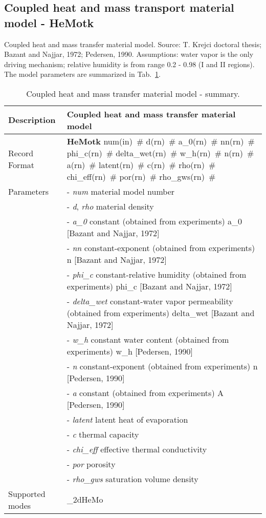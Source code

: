 \documentclass[a4paper]{article}
\newcommand{\descitem}[1]{{\noindent \bf #1}}
\newcommand{\elemparam}[2]{{{#1\tiny (#2)}~\#}}
\newcommand{\param}[1]{{\it #1}}
\newenvironment{mmt}{\begin{tabular}{|l|p{9cm}|}}{\end{tabular}\\}
\newenvironment{mmt}{\begin{tabular}{|l|l|}}{\end{tabular}\\}
\begin{document}
\subsection{Coupled heat and mass transport material model - HeMotk}
Coupled heat and mass transfer material model.
Source: T. Krejci doctoral thesis; Bazant and Najjar, 1972;
Pedersen, 1990. Assumptions: water vapor is the only driving
mechanism; relative humidity is from range 0.2 - 0.98 (I and II
regions). The model parameters are summarized
in Tab.~\ref{hemotk_table}.
\begin{table}[!htb]
\begin{mmt}
\hline
Description & Coupled heat and mass transfer material model\\
\hline
Record Format & \descitem{HeMotk} \elemparam{num}{in}
\elemparam{d}{rn} \elemparam{a\_0}{rn} \elemparam{nn}{rn}
\elemparam{phi\_c}{rn} \elemparam{delta\_wet}{rn}
\elemparam{w\_h}{rn} \elemparam{n}{rn}
\elemparam{a}{rn} \elemparam{latent}{rn}
\elemparam{c}{rn} \elemparam{rho}{rn}
\elemparam{chi\_eff}{rn} \elemparam{por}{rn}
\elemparam{rho\_gws}{rn}\\
Parameters &- \param{num} material model number\\
&- \param{d}, \param{rho} material density\\
&- \param{a\_0} constant (obtained from experiments) a\_0 [Bazant and Najjar, 1972]\\
&- \param{nn} constant-exponent (obtained from experiments) n [Bazant
and Najjar, 1972]\\
&- \param{phi\_c} constant-relative humidity  (obtained from experiments) phi\_c [Bazant and Najjar, 1972]\\
&- \param{delta\_wet} constant-water vapor permeability (obtained from
experiments) delta\_wet [Bazant and Najjar, 1972]\\
&- \param{w\_h} constant water content (obtained from experiments) w\_h
[Pedersen, 1990]\\
&- \param{n} constant-exponent (obtained from experiments) n [Pedersen, 1990]\\
&- \param{a} constant (obtained from experiments) A [Pedersen, 1990]\\
&- \param{latent} latent heat of evaporation\\
&- \param{c} thermal capacity\\
&- \param{chi\_eff} effective thermal conductivity\\
&- \param{por} porosity\\
&- \param{rho\_gws} saturation volume density\\
Supported modes& \_2dHeMo\\
\hline
\end{mmt}
\caption{Coupled heat and mass transfer material model - summary.}
\label{hemotk_table}
\end{table}
\end{document}
